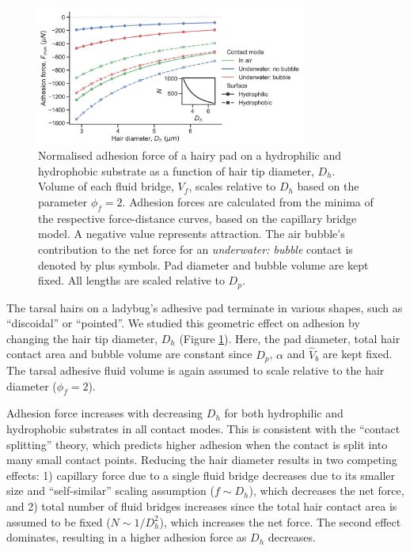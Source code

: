 \documentclass[vruler,JEB]{COB}%
\begin{document}
\begin{figure}
\includegraphics[width=3.5in]{Figure6-Model_effect_of_hair_size}
\caption{\label{fig:Effect-of-hair}Normalised adhesion force of a hairy pad on a hydrophilic and hydrophobic substrate as a function of
hair tip diameter, $D_{h}$. Volume of each fluid bridge, $V_{f}$, scales
relative to $D_{h}$ based on the parameter $\phi_{f}=2$. Adhesion
forces are calculated from the minima of the respective force-distance
curves, based on the capillary bridge model. A negative value represents
attraction. The air bubble's contribution to the net force for an \emph{underwater:
bubble} contact is denoted by plus symbols. Pad diameter and bubble
volume are kept fixed. All lengths are scaled relative to $D_{p}$.}
\end{figure}

The tarsal hairs on a ladybug's adhesive pad terminate in various shapes, such as ``discoidal''
or ``pointed''. We studied this geometric effect on adhesion by
changing the hair tip diameter, $D_{h}$ (Figure \ref{fig:Effect-of-hair}).
Here, the pad diameter, total hair contact area and bubble volume
are constant since $D_{p}$, $\alpha$ and $\hat{V}_{b}$ are kept
fixed. The tarsal adhesive fluid volume is again assumed to scale relative
to the hair diameter ($\phi_{f}=2$).

Adhesion force increases with decreasing $D_{h}$ for both hydrophilic
and hydrophobic substrates in all contact modes. This is consistent
with the ``contact splitting'' theory, which predicts higher adhesion
when the contact is split into many small contact points\citep{RN24}.
Reducing the hair diameter results in two competing effects: 1) capillary
force due to a single fluid bridge decreases due to its smaller size
and ``self-similar'' scaling assumption ($f\sim D_{h}$), which
decreases the net force, and 2) total number of fluid bridges increases
since the total hair contact area is assumed to be fixed ($N\sim1/D_{h}^{2}$),
which increases the net force. The second effect dominates, resulting
in a higher adhesion force as $D_{h}$ decreases. 
\end{document}
